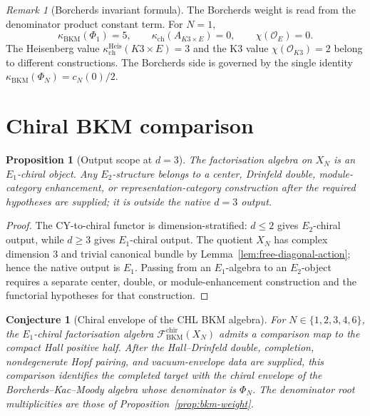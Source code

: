 \documentclass[11pt]{amsart}
\providecommand{\chir}{\mathrm{chir}}
\providecommand{\cF}{\mathcal{F}}
\providecommand{\cO}{\mathcal{O}}
\providecommand{\kch}{\kappa_{\mathrm{ch}}}
\providecommand{\kBKM}{\kappa_{\mathrm{BKM}}}
\theoremstyle{plain}
\newtheorem{proposition}[theorem]{Proposition}
\newtheorem{conjecture}[theorem]{Conjecture}
\theoremstyle{definition}
\theoremstyle{remark}
\newtheorem{remark}[theorem]{Remark}
\begin{document}
\begin{remark}[Borcherds invariant formula]\label{rem:borcherds-invariant-formula}
The Borcherds weight is read from the denominator product constant term.
For $N=1$,
\[
 \kBKM(\Phi_1)=5,\qquad
 \kch(A_{K3\times E})=0,\qquad
 \chi(\cO_E)=0.
\]
The Heisenberg value $\kch^{\mathrm{Heis}}(K3\times E)=3$ and the
K3 value $\chi(\cO_{K3})=2$ belong to different constructions. The
Borcherds side is governed by the single identity
$\kBKM(\Phi_N)=c_N(0)/2$.
\end{remark}

\section{Chiral BKM comparison}

\begin{proposition}[Output scope at $d=3$]\label{prop:d3-output-scope}
The factorisation algebra on $X_N$ is an $E_1$-chiral object. Any
$E_2$-structure belongs to a center, Drinfeld double, module-category
enhancement, or representation-category construction after the required
hypotheses are supplied; it is outside the native $d=3$ output.
\end{proposition}

\begin{proof}
The CY-to-chiral functor is dimension-stratified: $d\leq 2$ gives
$E_2$-chiral output, while $d\geq 3$ gives $E_1$-chiral output. The
quotient $X_N$ has complex dimension $3$ and trivial canonical bundle by
Lemma~\ref{lem:free-diagonal-action}; hence the native output is $E_1$.
Passing from an $E_1$-algebra to an $E_2$-object requires a separate
center, double, or module-enhancement construction and the functorial
hypotheses for that construction.
\end{proof}

\begin{conjecture}[Chiral envelope of the CHL BKM algebra]\label{conj:chl-chiral-bkm}
For $N\in\{1,2,3,4,6\}$, the $E_1$-chiral factorisation algebra
$\cF^{\chir}_{\mathrm{BKM}}(X_N)$ admits a comparison map to the compact
Hall positive half. After the Hall--Drinfeld double, completion,
nondegenerate Hopf pairing, and vacuum-envelope data are supplied, this
comparison identifies the completed target with the chiral envelope of
the Borcherds--Kac--Moody algebra whose denominator is $\Phi_N$. The
denominator root multiplicities are those of
Proposition~\ref{prop:bkm-weight}.
\end{conjecture}
\end{document}
